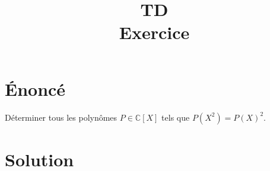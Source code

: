 \documentclass[french]{article}
\title{TD  \\ Exercice }
\date{}
\newcommand{\C}{\mathbb{C}}
\begin{document}
\maketitle
	
\section{Énoncé}
	Déterminer tous les polynômes $P\in\C[X]$ tels que $P(X^2)=P(X)^2$.
\section{Solution}
	
\end{document}
